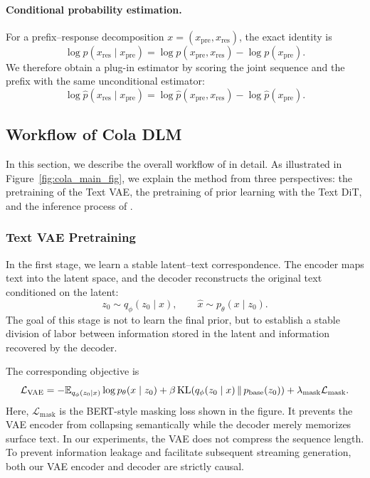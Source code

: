 \paragraph{\textbf{Conditional probability estimation.}}
For a prefix--response decomposition \(x=(x_{\mathrm{pre}},x_{\mathrm{res}})\), the exact identity is
\begin{equation}
\log p(x_{\mathrm{res}}\mid x_{\mathrm{pre}})
=
\log p(x_{\mathrm{pre}},x_{\mathrm{res}})
-
\log p(x_{\mathrm{pre}}).
\label{eq:main_cond_identity}
\end{equation}
We therefore obtain a plug-in estimator by scoring the joint sequence and the prefix with the same unconditional estimator:
\begin{equation}
\log \widehat p(x_{\mathrm{res}}\mid x_{\mathrm{pre}})
=
\log \widehat p(x_{\mathrm{pre}},x_{\mathrm{res}})
-
\log \widehat p(x_{\mathrm{pre}}).
\label{eq:main_cond_estimator}
\end{equation}

\subsection{Workflow of Cola DLM}
In this section, we describe the overall workflow of \method in detail. As illustrated in Figure~\ref{fig:cola_main_fig}, we explain the method from three perspectives: the pretraining of the Text VAE, the pretraining of prior learning with the Text DiT, and the inference process of \method.
\subsubsection{Text VAE Pretraining}

In the first stage, we learn a stable latent--text correspondence. The encoder maps text into the latent space, and the decoder reconstructs the original text conditioned on the latent:
\begin{equation}
z_0\sim q_\phi(z_0\mid x),
\qquad
\hat x\sim p_\theta(x\mid z_0).
\label{eq:main_stage1_io}
\end{equation}
The goal of this stage is not to learn the final prior, but to establish a stable division of labor between information stored in the latent and information recovered by the decoder.

The corresponding objective is
\begin{equation}
\mathcal L_{\mathrm{VAE}}
=
-\mathbb E_{q_\phi(z_0\mid x)}\log p_\theta(x\mid z_0)
+\beta\,\mathrm{KL}(q_\phi(z_0\mid x)\,\|\,p_{\mathrm{base}}(z_0))
+\lambda_{\mathrm{mask}}\mathcal L_{\mathrm{mask}}.
\label{eq:main_stage1_loss}
\end{equation}
Here, \(\mathcal L_{\mathrm{mask}}\) is the BERT-style masking loss shown in the figure. It prevents the VAE encoder from collapsing semantically while the decoder merely memorizes surface text. In our experiments, the VAE does not compress the sequence length. To prevent information leakage and facilitate subsequent streaming generation, both our VAE encoder and decoder are strictly causal.

